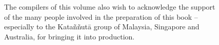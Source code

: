 {{\begin{minipage}{0.9\linewidth}
\vspace*{2\baselineskip}
The compilers of this volume also wish to acknowledge the support\\ of the many people involved in the preparation of this book --\\ especially to the Kata\~n\~nut\=a group of Malaysia, Singapore and\\ Australia, for bringing it into production.
\bigskip

\end{minipage}

}

\tableofcontents

\cleardoublepage

}


